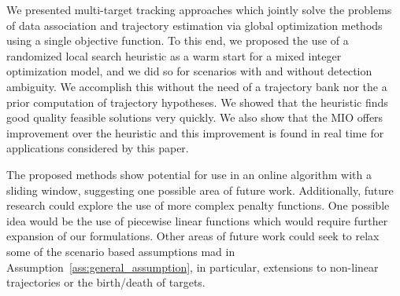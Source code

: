 We presented multi-target tracking approaches which jointly solve the problems of data association and trajectory estimation via global optimization methods using a single objective function. To this end, we proposed the use of a randomized local search heuristic as a warm start for a mixed integer optimization model, and we did so for scenarios with and without detection ambiguity. We accomplish this without the need of a trajectory bank nor the a prior computation of trajectory hypotheses. We showed that the heuristic finds good quality feasible solutions very quickly. We also show that the MIO offers improvement over the heuristic and this improvement is found in real time for applications considered by this paper.  

The proposed methods show potential for use in an online algorithm with a sliding window, suggesting one possible area of future work. Additionally, future research could explore the use of more complex penalty functions. One possible idea would be the use of piecewise linear functions which would require further expansion of our formulations. Other areas of future work could seek to relax some of the scenario based assumptions mad in Assumption~\ref{ass:general_assumption}, in particular, extensions to non-linear trajectories or the birth/death of targets. 